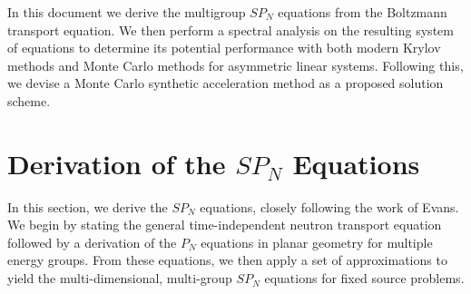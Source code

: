 \documentclass[letterpaper,12pt]{article}
\begin{document}
In this document we derive the multigroup $SP_N$ equations from the
Boltzmann transport equation. We then perform a spectral analysis on
the resulting system of equations to determine its potential
performance with both modern Krylov methods and Monte Carlo methods
for asymmetric linear systems. Following this, we devise a Monte Carlo
synthetic acceleration method as a proposed solution scheme.

\section{Derivation of the $SP_N$ Equations}
\label{sec:derivation}
In this section, we derive the $SP_N$ equations, closely following the
work of Evans. We begin by stating the general time-independent
neutron transport equation followed by a derivation of the $P_N$
equations in planar geometry for multiple energy groups. From these
equations, we then apply a set of approximations to yield the
multi-dimensional, multi-group $SP_N$ equations for fixed source
problems.
\end{document}
